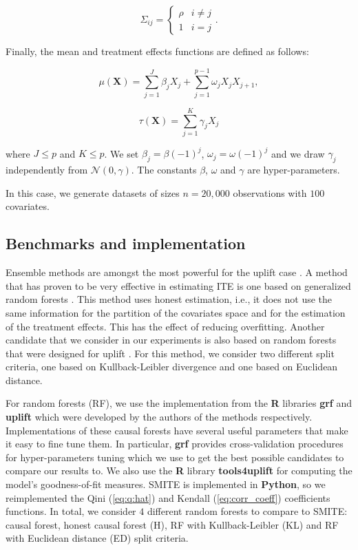 \documentclass{article}
\def\X{\mathbf X}
\begin{document}
\[\Sigma_{ij} = \begin{cases} 
      \rho & i\neq j \\
      1 & i=j
   \end{cases}.
\]

Finally, the mean and treatment effects functions are defined as follows:

$$\mu(\X) = \sum_{j=1}^J \beta_j X_j + \sum_{j=1}^{p-1} \omega_j X_j X_{j+1},$$ 


$$\tau(\X) = \sum_{j=1}^K \gamma_j X_j$$

where $J\leq p$ and $K \leq p$. We set $\beta_j = \beta (-1)^{j}$, $\omega_j = \omega (-1)^j$ and we draw $\gamma_j$ independently from $\mathcal{N}(0,\gamma)$. The constants $\beta$, $\omega$ and $\gamma$ are hyper-parameters.

In this case, we generate datasets of sizes $n=20,000$ observations with $100$ covariates.



\subsection{Benchmarks and implementation}

Ensemble methods are amongst the most powerful for the uplift case \citep{soltys2015ensemble}. A method that has proven to be very effective in estimating ITE is one based on generalized random forests \citep{athey2019generalized}. This method uses honest estimation, i.e., it does not use the same information for the partition of the covariates space and for the estimation of the treatment effects. This has the effect of reducing overfitting. Another candidate that we consider in our experiments is also based on random forests that were designed for uplift \citep{guelman2012random, jaskowski2012uplift}. For this method, we consider two different split criteria, one based on Kullback-Leibler divergence and one based on Euclidean distance.

For random forests (RF), we use the implementation from the \textbf{R} libraries \textbf{grf} and \textbf{uplift} which were developed by the authors of the methods respectively. Implementations of these causal forests have several useful parameters that make it easy to fine tune them. In particular, \textbf{grf} provides cross-validation procedures for hyper-parameters tuning which we use to get the best possible candidates to compare our results to. We also use the \textbf{R} library \textbf{tools4uplift} for computing the model's goodness-of-fit measures. SMITE is implemented in \textbf{Python}, so we reimplemented the Qini (\ref{eq:q:hat}) and Kendall (\ref{eq:corr_coeff}) coefficients functions. In total, we consider $4$ different random forests to compare to SMITE: causal forest, honest causal forest (H), RF with Kullback-Leibler (KL) and RF with Euclidean distance (ED) split criteria. 
\end{document}

